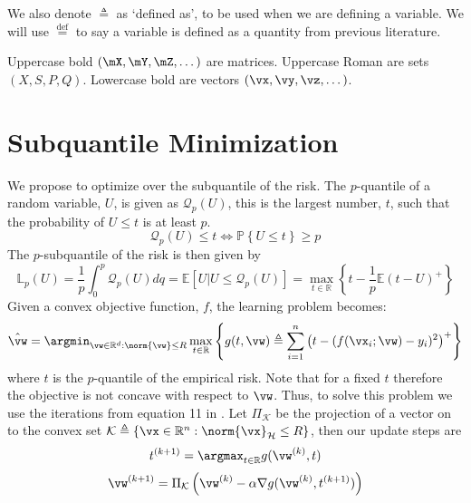 \documentclass{article} %
\theoremstyle{plain}
\theoremstyle{definition}
\theoremstyle{remark}
\begin{document}
	We also denote $\triangleq$ as `defined as', to be used when we are defining a variable. We will use $\stackrel{\text{def}}{=}$ to say a variable is defined as a quantity from previous literature. 
	
	Uppercase bold $(\mX,\mY,\mZ,\dots)$ are matrices. Uppercase Roman are sets $(X,S,P,Q)$. Lowercase bold are vectors $(\vx,\vy,\vz,\dots)$.
	
	\section{Subquantile Minimization}
	We propose to optimize over the subquantile of the risk. The $p$-quantile of a random variable, $U$, is given as $\mathcal{Q}_p(U)$, this is the largest number, $t$, such that the probability of $U \leq t$ is at least $p$. 
	\begin{equation}
		\mathcal{Q}_p(U) \leq t \iff \mathbb{P}\left\{U \leq t\right\} \geq p
	\end{equation}
	The $p$-subquantile of the risk is then given by
	\begin{equation}
		\mathbb{L}_{p}\left(U\right) = \frac{1}{p}\int_0^p\mathcal{Q}_p\left(U\right)dq = \mathbb{E}\left[U \vert U\leq \mathcal{Q}_p\left(U\right)\right] = \max_{t \in \mathbb{R}}\left\{t - \frac{1}{p}\mathbb{E}\left(t- U\right)^+\right\}
	\end{equation}
	Given a convex objective function, $f$, the learning problem becomes:
	\begin{equation}
		\hat{\vw} = \argmin_{\vw \in \mathbb{R}^d: \norm{\vw} \leq R} \max_{t \in \mathbb{R}} \left\{g(t,\vw) \triangleq \sum_{i=1}^n\left(t - (f(\vx_i;\vw) - y_i)^2\right)^+\right\}
	\end{equation}
	where $t$ is the $p$-quantile of the empirical risk. Note that for a fixed $t$ therefore the objective is not concave with respect to $\vw$. Thus, to solve this problem we use the iterations from equation 11 in \citep{razaviyayn:2020}. Let $\Pi_{\mathcal{K}}$ be the projection of a vector on to the convex set $\mathcal{K} \triangleq \{\vx \in \mathbb{R}^n: \norm{\vx}_{\mathcal{H}} \leq R\}$, then our update steps are
	\begin{equation}
		\label{eqn:t-update}
		t^{(k+1)} = \argmax_{t \in \mathbb{R}} g(\vw^{(k)},t)
	\end{equation}
	\begin{equation}
		\label{eqn:theta-update}
		\vw^{(k+1)} = \Pi_{\mathcal{K}}\left(\vw^{(k)} - \alpha \nabla g(\vw^{(k)},t^{(k+1)})\right)
	\end{equation}
\end{document}
